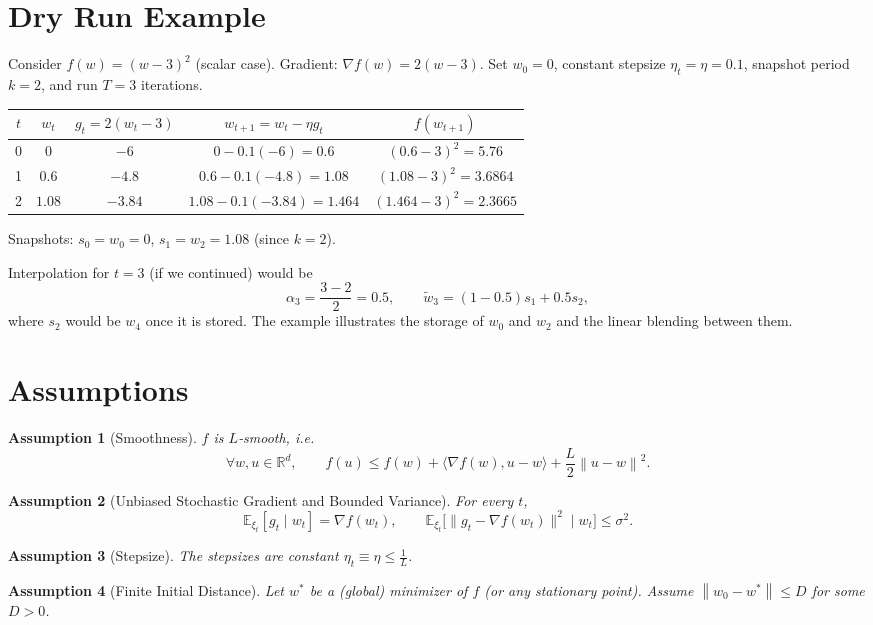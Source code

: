 \documentclass{article}
\newtheorem{assumption}{Assumption}
\newcommand{\E}{\mathbb{E}}
\newcommand{\norm}[1]{\left\lVert#1\right\rVert}
\begin{document}
\section*{Dry Run Example}
Consider $f(w)=(w-3)^2$ (scalar case).  
Gradient: $\nabla f(w)=2(w-3)$.  
Set $w_0=0$, constant stepsize $\eta_t=\eta=0.1$, snapshot period $k=2$, and run $T=3$ iterations.

\begin{center}
\begin{tabular}{c|c|c|c|c}
$t$ & $w_t$ & $g_t=2(w_t-3)$ & $w_{t+1}=w_t-\eta g_t$ & $f(w_{t+1})$\\ \hline
0 & $0$ & $-6$ & $0-0.1(-6)=0.6$ & $(0.6-3)^2=5.76$\\
1 & $0.6$ & $-4.8$ & $0.6-0.1(-4.8)=1.08$ & $(1.08-3)^2=3.6864$\\
2 & $1.08$ & $-3.84$ & $1.08-0.1(-3.84)=1.464$ & $(1.464-3)^2=2.3665$\\
\end{tabular}
\end{center}

Snapshots: $s_0=w_0=0$, $s_1=w_2=1.08$ (since $k=2$).  

Interpolation for $t=3$ (if we continued) would be
\[
\alpha_3=\frac{3-2}{2}=0.5,\qquad 
\tilde w_3 = (1-0.5)s_1+0.5 s_2,
\]
where $s_2$ would be $w_4$ once it is stored. The example illustrates the storage of $w_{0}$ and $w_{2}$ and the linear blending between them.

\section*{Assumptions}
\begin{assumption}[Smoothness]
\label{ass:smooth}
$f$ is $L$‑smooth, i.e.
\[
\forall w,u\in\mathbb{R}^d,\qquad
f(u)\le f(w)+\langle \nabla f(w),u-w\rangle+\frac{L}{2}\norm{u-w}^2 .
\]
\end{assumption}
\begin{assumption}[Unbiased Stochastic Gradient and Bounded Variance]
\label{ass:unbiased}
For every $t$, 
\[
\E_{\xi_t}[g_t\mid w_t]=\nabla f(w_t),\qquad
\E_{\xi_t}\big[\|g_t-\nabla f(w_t)\|^2\mid w_t\big]\le\sigma^2 .
\]
\end{assumption}
\begin{assumption}[Stepsize]
\label{ass:stepsize}
The stepsizes are constant $\eta_t\equiv\eta\le \frac{1}{L}$.
\end{assumption}
\begin{assumption}[Finite Initial Distance]
\label{ass:bounded}
Let $w^*$ be a (global) minimizer of $f$ (or any stationary point). Assume $\norm{w_0-w^*}\le D$ for some $D>0$.
\end{assumption}
\end{document}
